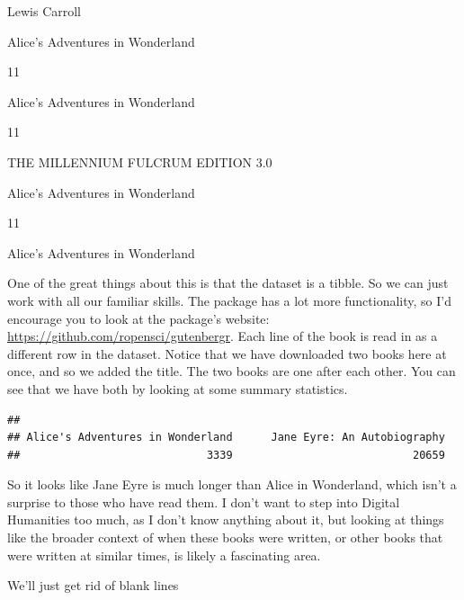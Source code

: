 \documentclass[
]{book}
\newenvironment{Shaded}{\begin{snugshade}}{\end{snugshade}}
\newcommand{\AlertTok}[1]{\textcolor[rgb]{0.94,0.16,0.16}{#1}}
\newcommand{\CommentTok}[1]{\textcolor[rgb]{0.56,0.35,0.01}{\textit{#1}}}
\newcommand{\DataTypeTok}[1]{\textcolor[rgb]{0.13,0.29,0.53}{#1}}
\newcommand{\DecValTok}[1]{\textcolor[rgb]{0.00,0.00,0.81}{#1}}
\newcommand{\KeywordTok}[1]{\textcolor[rgb]{0.13,0.29,0.53}{\textbf{#1}}}
\newcommand{\NormalTok}[1]{#1}
\newcommand{\OperatorTok}[1]{\textcolor[rgb]{0.81,0.36,0.00}{\textbf{#1}}}
\newcommand{\StringTok}[1]{\textcolor[rgb]{0.31,0.60,0.02}{#1}}
\begin{document}
Lewis Carroll

Alice's Adventures in Wonderland

11

Alice's Adventures in Wonderland

11

THE MILLENNIUM FULCRUM EDITION 3.0

Alice's Adventures in Wonderland

11

Alice's Adventures in Wonderland

One of the great things about this is that the dataset is a tibble. So we can just work with all our familiar skills. The package has a lot more functionality, so I'd encourage you to look at the package's website: \url{https://github.com/ropensci/gutenbergr}. Each line of the book is read in as a different row in the dataset. Notice that we have downloaded two books here at once, and so we added the title. The two books are one after each other. You can see that we have both by looking at some summary statistics.

\begin{Shaded}
\end{Shaded}

\begin{verbatim}
## 
## Alice's Adventures in Wonderland      Jane Eyre: An Autobiography 
##                             3339                            20659
\end{verbatim}

So it looks like Jane Eyre is much longer than Alice in Wonderland, which isn't a surprise to those who have read them. I don't want to step into Digital Humanities too much, as I don't know anything about it, but looking at things like the broader context of when these books were written, or other books that were written at similar times, is likely a fascinating area.

We'll just get rid of blank lines

\begin{Shaded}
\end{Shaded}
\end{document}
